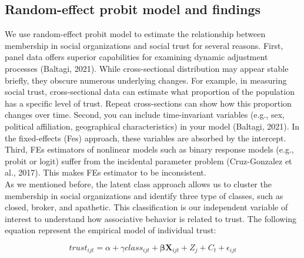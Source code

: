 \subsection{Random-effect probit model and findings}
We use random-effect probit model to estimate the relationship between membership in social organizations and social trust for several reasons. First, panel data offers superior capabilities for examining dynamic adjustment processes (Baltagi, 2021). While cross-sectional distribution may appear stable briefly, they obscure numerous underlying changes. For example, in measuring social trust, cross-sectional data can estimate what proportion of the population has a specific level of trust. Repeat cross-sections can show how this proportion changes over time. Second, you can include time-invariant variables (e.g., sex, political affiliation, geographical characteristics) in your model (Baltagi, 2021). In the fixed-effects (Fes) approach, these variables are absorbed by the intercept. Third, FEs estimators of nonlinear models such as binary response models (e.g., probit or logit) suffer from the incidental parameter problem (Cruz-Gonzalez et al., 2017). This makes FEs estimator to be inconsistent. \\

As we mentioned before, the latent class approach allows us to cluster the membership in social organizations and identify three type of classes, such as closed, broker, and apathetic. This classification is our independent variable of interest to understand how associative behavior is related to trust. The following equation represent the empirical model of individual trust:

\begin{equation}
trust_{ijt} = \alpha + \gamma class_{ijt} + \boldsymbol{\beta} \mathbf{X}_{ijt} + Z_{j} + C_{t} + \epsilon_{ijt}
\end{equation}


